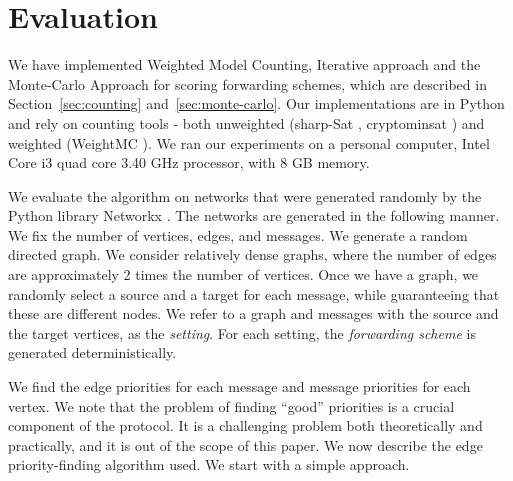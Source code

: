 \documentclass[11pt,eepic]{article}
\begin{document}
\section{Evaluation}
	\label{sec:eval}
	We have implemented Weighted Model Counting, Iterative approach and the Monte-Carlo Approach for scoring forwarding schemes, which are described in Section~\ref{sec:counting} and~\ref{sec:monte-carlo}. Our implementations are in Python and rely on counting tools - both unweighted (sharp-Sat \cite{sharpSat}, cryptominsat \cite{cryptominsat}) and weighted (WeightMC \cite{WeightMC}). We ran our experiments on a personal computer, Intel Core i3 quad core 3.40 GHz processor, with 8 GB memory.

		We evaluate the algorithm on networks that were generated randomly by the Python library Networkx
		 \cite{HSS08}.
		The networks are generated in the following manner.
		We fix the number of vertices, edges, and messages.
		We generate a random directed graph.
		We consider relatively dense graphs, where the number of edges are approximately 2 times the number of vertices.
		Once we have a graph, we randomly select a source and a target for each message,
		while guaranteeing that these are different nodes.
		We refer to a graph and messages with the source and the target vertices,
		as the {\em setting}.
		For each setting, the {\em forwarding scheme} is generated deterministically.

		We find the edge priorities for each message and message priorities for each vertex. We note that the problem of finding ``good'' priorities is a crucial component of the protocol. It is a challenging problem both theoretically and practically, and it is out of the scope of this paper. We now describe the edge priority-finding algorithm used. We start with a simple approach.
\end{document}
